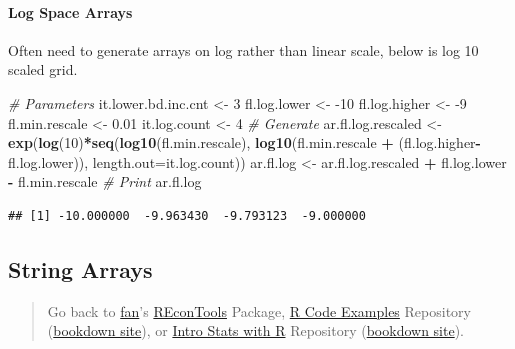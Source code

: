 \documentclass[
]{book}
\newenvironment{Shaded}{\begin{snugshade}}{\end{snugshade}}
\newcommand{\CommentTok}[1]{\textcolor[rgb]{0.56,0.35,0.01}{\textit{#1}}}
\newcommand{\DataTypeTok}[1]{\textcolor[rgb]{0.13,0.29,0.53}{#1}}
\newcommand{\DecValTok}[1]{\textcolor[rgb]{0.00,0.00,0.81}{#1}}
\newcommand{\FloatTok}[1]{\textcolor[rgb]{0.00,0.00,0.81}{#1}}
\newcommand{\KeywordTok}[1]{\textcolor[rgb]{0.13,0.29,0.53}{\textbf{#1}}}
\newcommand{\NormalTok}[1]{#1}
\newcommand{\OperatorTok}[1]{\textcolor[rgb]{0.81,0.36,0.00}{\textbf{#1}}}
\newcommand{\StringTok}[1]{\textcolor[rgb]{0.31,0.60,0.02}{#1}}
\begin{document}
\hypertarget{log-space-arrays}{%
\paragraph{Log Space Arrays}\label{log-space-arrays}}

Often need to generate arrays on log rather than linear scale, below is log 10 scaled grid.

\begin{Shaded}
\begin{Highlighting}[]
\CommentTok{\# Parameters}
\NormalTok{it.lower.bd.inc.cnt \textless{}{-}}\StringTok{ }\DecValTok{3}
\NormalTok{fl.log.lower \textless{}{-}}\StringTok{ }\DecValTok{{-}10}
\NormalTok{fl.log.higher \textless{}{-}}\StringTok{ }\DecValTok{{-}9}
\NormalTok{fl.min.rescale \textless{}{-}}\StringTok{ }\FloatTok{0.01}
\NormalTok{it.log.count \textless{}{-}}\StringTok{ }\DecValTok{4}
\CommentTok{\# Generate}
\NormalTok{ar.fl.log.rescaled \textless{}{-}}\StringTok{ }\KeywordTok{exp}\NormalTok{(}\KeywordTok{log}\NormalTok{(}\DecValTok{10}\NormalTok{)}\OperatorTok{*}\KeywordTok{seq}\NormalTok{(}\KeywordTok{log10}\NormalTok{(fl.min.rescale),}
                                      \KeywordTok{log10}\NormalTok{(fl.min.rescale }\OperatorTok{+}
\StringTok{                                              }\NormalTok{(fl.log.higher}\OperatorTok{{-}}\NormalTok{fl.log.lower)),}
                                      \DataTypeTok{length.out=}\NormalTok{it.log.count))}
\NormalTok{ar.fl.log \textless{}{-}}\StringTok{ }\NormalTok{ar.fl.log.rescaled }\OperatorTok{+}\StringTok{ }\NormalTok{fl.log.lower }\OperatorTok{{-}}\StringTok{ }\NormalTok{fl.min.rescale}
\CommentTok{\# Print}
\NormalTok{ar.fl.log}
\end{Highlighting}
\end{Shaded}

\begin{verbatim}
## [1] -10.000000  -9.963430  -9.793123  -9.000000
\end{verbatim}

\hypertarget{string-arrays}{%
\subsection{String Arrays}\label{string-arrays}}

\begin{quote}
Go back to \href{http://fanwangecon.github.io/}{fan}'s \href{https://fanwangecon.github.io/REconTools/}{REconTools} Package, \href{https://fanwangecon.github.io/R4Econ/}{R Code Examples} Repository (\href{https://fanwangecon.github.io/R4Econ/bookdown}{bookdown site}), or \href{https://fanwangecon.github.io/Stat4Econ/}{Intro Stats with R} Repository (\href{https://fanwangecon.github.io/Stat4Econ/bookdown}{bookdown site}).
\end{quote}
\end{document}
